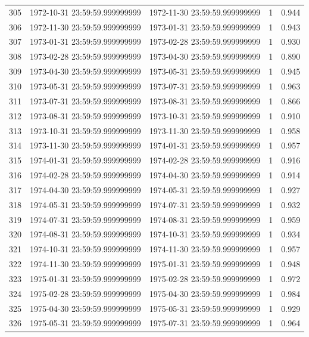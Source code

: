 \begin{table}
\begin{tabular}{lcccc}
305 & 1972-10-31 23:59:59.999999999 & 1972-11-30 23:59:59.999999999 & 1 & 0.944 \\
306 & 1972-11-30 23:59:59.999999999 & 1973-01-31 23:59:59.999999999 & 1 & 0.943 \\
307 & 1973-01-31 23:59:59.999999999 & 1973-02-28 23:59:59.999999999 & 1 & 0.930 \\
308 & 1973-02-28 23:59:59.999999999 & 1973-04-30 23:59:59.999999999 & 1 & 0.890 \\
309 & 1973-04-30 23:59:59.999999999 & 1973-05-31 23:59:59.999999999 & 1 & 0.945 \\
310 & 1973-05-31 23:59:59.999999999 & 1973-07-31 23:59:59.999999999 & 1 & 0.963 \\
311 & 1973-07-31 23:59:59.999999999 & 1973-08-31 23:59:59.999999999 & 1 & 0.866 \\
312 & 1973-08-31 23:59:59.999999999 & 1973-10-31 23:59:59.999999999 & 1 & 0.910 \\
313 & 1973-10-31 23:59:59.999999999 & 1973-11-30 23:59:59.999999999 & 1 & 0.958 \\
314 & 1973-11-30 23:59:59.999999999 & 1974-01-31 23:59:59.999999999 & 1 & 0.957 \\
315 & 1974-01-31 23:59:59.999999999 & 1974-02-28 23:59:59.999999999 & 1 & 0.916 \\
316 & 1974-02-28 23:59:59.999999999 & 1974-04-30 23:59:59.999999999 & 1 & 0.914 \\
317 & 1974-04-30 23:59:59.999999999 & 1974-05-31 23:59:59.999999999 & 1 & 0.927 \\
318 & 1974-05-31 23:59:59.999999999 & 1974-07-31 23:59:59.999999999 & 1 & 0.932 \\
319 & 1974-07-31 23:59:59.999999999 & 1974-08-31 23:59:59.999999999 & 1 & 0.959 \\
320 & 1974-08-31 23:59:59.999999999 & 1974-10-31 23:59:59.999999999 & 1 & 0.934 \\
321 & 1974-10-31 23:59:59.999999999 & 1974-11-30 23:59:59.999999999 & 1 & 0.957 \\
322 & 1974-11-30 23:59:59.999999999 & 1975-01-31 23:59:59.999999999 & 1 & 0.948 \\
323 & 1975-01-31 23:59:59.999999999 & 1975-02-28 23:59:59.999999999 & 1 & 0.972 \\
324 & 1975-02-28 23:59:59.999999999 & 1975-04-30 23:59:59.999999999 & 1 & 0.984 \\
325 & 1975-04-30 23:59:59.999999999 & 1975-05-31 23:59:59.999999999 & 1 & 0.929 \\
326 & 1975-05-31 23:59:59.999999999 & 1975-07-31 23:59:59.999999999 & 1 & 0.964 \\

\end{tabular}
\end{table}
